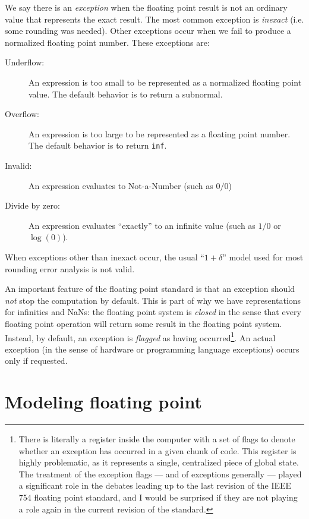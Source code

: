 \documentclass[12pt, leqno]{article} %
\begin{document}
We say there is an {\em exception} when the floating point result is
not an ordinary value that represents the exact result.  The most
common exception is {\em inexact} (i.e. some rounding was needed).
Other exceptions occur when we fail to produce a normalized floating
point number.  These exceptions are:
\begin{description}
\item[Underflow:]
  An expression is too small to be represented as a normalized floating
  point value.  The default behavior is to return a subnormal.
\item[Overflow:]
  An expression is too large to be represented as a floating point
  number.  The default behavior is to return {\tt inf}.
\item[Invalid:]
  An expression evaluates to Not-a-Number (such as $0/0$)
\item[Divide by zero:]
  An expression evaluates ``exactly'' to an infinite value
  (such as $1/0$ or $\log(0)$).
\end{description}
When exceptions other than inexact occur, the usual ``$1 + \delta$''
model used for most rounding error analysis is not valid.

An important feature of the floating point standard is that an
exception should {\em not} stop the computation by default.  This
is part of why we have representations for infinities and NaNs:
the floating point system is {\em closed} in the sense that every
floating point operation will return some result in the floating
point system.  Instead, by default, an exception is {\em flagged}
as having occurred\footnote{%
There is literally a register inside the computer with a set of
flags to denote whether an exception has occurred in a given
chunk of code.  This register is highly problematic, as it
represents a single, centralized piece of global state.  The
treatment of the exception flags --- and of exceptions generally ---
played a significant role in the debates leading up to the last revision
of the IEEE 754 floating point standard,
and I would be surprised if they are not playing a role again in the
current revision of the standard.
}.  An actual exception (in the sense of hardware
or programming language exceptions) occurs only if requested.

\section{Modeling floating point}
\end{document}
